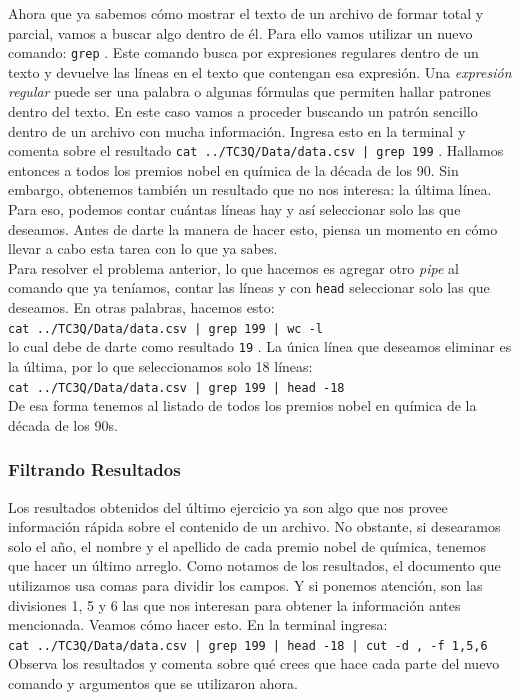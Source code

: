 \documentclass[10pt,letterpaper]{article}
\newcommand{\inlinecode}[1]{
\colorbox{light-gray}{\texttt{#1}}
}
\begin{document}
Ahora que ya sabemos c\'omo mostrar el texto de un archivo de formar total y parcial, vamos a buscar algo dentro de \'el. Para ello vamos utilizar un nuevo comando: \inlinecode{grep}. Este comando busca por expresiones regulares dentro de un texto y devuelve las l\'ineas en el texto que contengan esa expresi\'on. Una \emph{expresi\'on regular} puede ser una palabra o algunas f\'ormulas que permiten hallar patrones dentro del texto. En este caso vamos a proceder buscando un patr\'on sencillo dentro de un archivo con mucha informaci\'on. Ingresa esto en la terminal y comenta sobre el resultado \inlinecode{cat ../TC3Q/Data/data.csv | grep 199}. Hallamos entonces a todos los premios nobel en qu\'imica de la d\'ecada de los 90. Sin embargo, obtenemos tambi\'en un resultado que no nos interesa: la \'ultima l\'inea. Para eso, podemos contar cu\'antas l\'ineas hay y as\'i seleccionar solo las que deseamos. Antes de darte la manera de hacer esto, piensa un momento en c\'omo llevar a cabo esta tarea con lo que ya sabes.\\

Para resolver el problema anterior, lo que hacemos es agregar otro \emph{pipe} al comando que ya ten\'iamos, contar las l\'ineas y con \inlinecode{head} seleccionar solo las que deseamos. En otras palabras, hacemos esto:\\
\inlinecode{cat ../TC3Q/Data/data.csv | grep 199 | wc -l}\\
lo cual debe de darte como resultado \inlinecode{19}. La \'unica l\'inea que deseamos eliminar es la \'ultima, por lo que seleccionamos solo 18 l\'ineas:\\
\inlinecode{cat ../TC3Q/Data/data.csv | grep 199 | head -18}\\
De esa forma tenemos al listado de todos los premios nobel en qu\'imica de la d\'ecada de los 90s.

\subsubsection{Filtrando Resultados}
Los resultados obtenidos del \'ultimo ejercicio ya son algo que nos provee informaci\'on r\'apida sobre el contenido de un archivo. No obstante, si desearamos solo el a\~no, el nombre y el apellido de cada premio nobel de qu\'imica, tenemos que hacer un \'ultimo arreglo. Como notamos de los resultados, el documento que utilizamos usa comas para dividir los campos. Y si ponemos atenci\'on, son las divisiones 1, 5 y 6 las que nos interesan para obtener la informaci\'on antes mencionada. Veamos c\'omo hacer esto. En la terminal ingresa:\\
\inlinecode{cat ../TC3Q/Data/data.csv | grep 199 | head -18 | cut -d , -f 1,5,6}\\
Observa los resultados y comenta sobre qu\'e crees que hace cada parte del nuevo comando y argumentos que se utilizaron ahora.\\
\end{document}
